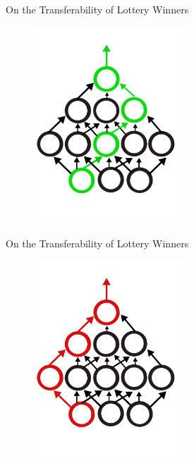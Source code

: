\documentclass{beamer}
\begin{document}
\begin{frame}{On the Transferability of Lottery Winners}

	\begin{figure}
		\includegraphics[width=0.5\textwidth]{figures/mlp_ticket_3.pdf}
	\end{figure}

\end{frame}

\begin{frame}{On the Transferability of Lottery Winners}

	\begin{figure}
		\includegraphics[width=0.5\textwidth]{figures/random_ticket_1.pdf}
	\end{figure}

\end{frame}
\end{document}
